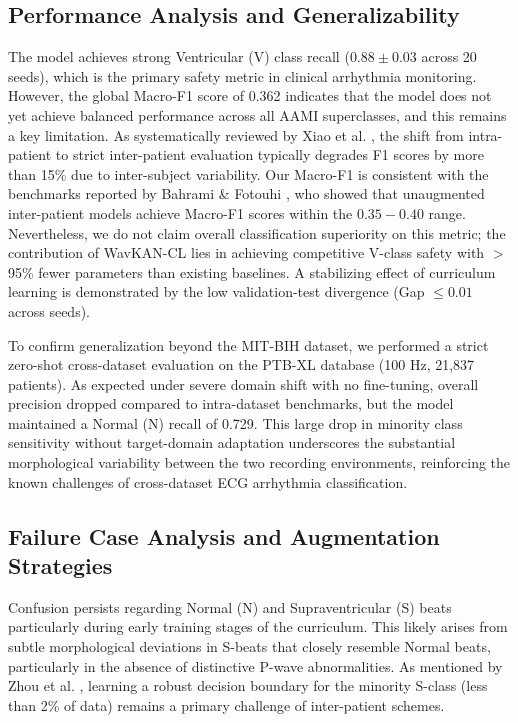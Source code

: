 \documentclass[pdflatex,sn-mathphys-num]{sn-jnl}
\theoremstyle{thmstyleone}
\theoremstyle{thmstyletwo}
\theoremstyle{thmstylethree}
\begin{document}
\subsection{Performance Analysis and Generalizability}
The model achieves strong Ventricular (V) class recall ($0.88 \pm 0.03$ across 20 seeds), which is the primary safety metric in clinical arrhythmia monitoring. However, the global Macro-F1 score of 0.362 indicates that the model does not yet achieve balanced performance across all AAMI superclasses, and this remains a key limitation. As systematically reviewed by Xiao et al. \cite{xiao_deep_2023}, the shift from intra-patient to strict inter-patient evaluation typically degrades F1 scores by more than 15\% due to inter-subject variability. Our Macro-F1 is consistent with the benchmarks reported by Bahrami \& Fotouhi \cite{bahrami_investigation_2025}, who showed that unaugmented inter-patient models achieve Macro-F1 scores within the $0.35 - 0.40$ range. Nevertheless, we do not claim overall classification superiority on this metric; the contribution of WavKAN-CL lies in achieving competitive V-class safety with $>$95\% fewer parameters than existing baselines. A stabilizing effect of curriculum learning is demonstrated by the low validation-test divergence (Gap $\le 0.01$ across seeds).

To confirm generalization beyond the MIT-BIH dataset, we performed a strict zero-shot cross-dataset evaluation on the PTB-XL database (100 Hz, 21,837 patients). As expected under severe domain shift with no fine-tuning, overall precision dropped compared to intra-dataset benchmarks, but the model maintained a Normal (N) recall of 0.729. This large drop in minority class sensitivity without target-domain adaptation underscores the substantial morphological variability between the two recording environments, reinforcing the known challenges of cross-dataset ECG arrhythmia classification.

\subsection{Failure Case Analysis and Augmentation Strategies}
Confusion persists regarding Normal (N) and Supraventricular (S) beats particularly during early training stages of the curriculum. This likely arises from subtle morphological deviations in S-beats that closely resemble Normal beats, particularly in the absence of distinctive P-wave abnormalities. As mentioned by Zhou et al. \cite{zhou_inter-patient_2024}, learning a robust decision boundary for the minority S-class (less than 2\% of data) remains a primary challenge of inter-patient schemes. 
\end{document}
